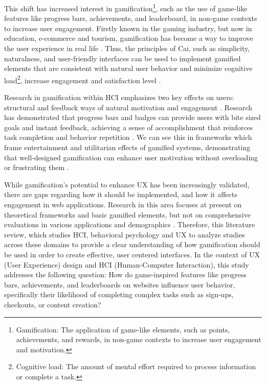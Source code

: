 \documentclass[conference]{IEEEtran}
\begin{document}
This shift has increased interest in gamification\footnote{Gamification: The application of game-like elements, such as points, achievements, and rewards, in non-game contexts to increase user engagement and motivation.}, such as the use of game-like features like progress bars, achievements, and leaderboard, in non-game contexts to increase user engagement. Firstly known in the gaming industry, but now in education, e-commerce and tourism, gamification has become a way to improve the user experience in real life \cite{hiererra2022, clanton1998}. Thus, the principles of Cai, such as simplicity, naturalness, and user-friendly interfaces can be used to implement gamified elements that are consistent with natural user behavior and minimize cognitive load\footnote{Cognitive load: The amount of mental effort required to process information or complete a task.}, increase engagement and satisfaction level \cite{cai2009}.

Research in gamification within HCI emphasizes two key effects on users: structural and feedback ways of natural motivation and engagement \cite{healey2011, clanton1998}. Research has demonstrated that progress bars and badges can provide users with bite sized goals and instant feedback, achieving a sense of accomplishment that reinforces task completion and behavior repetition \cite{marchionini1992, chang2016}. We can see this in frameworks which frame entertainment and utilitarian effects of gamified systems, demonstrating that well-designed gamification can enhance user motivation without overloading or frustrating them \cite{deliu2017}.

While gamification’s potential to enhance UX has been increasingly validated, there are gaps regarding how it should be implemented, and how it affects engagement in web applications. Research in this area focuses at present on theoretical frameworks and basic gamified elements, but not on comprehensive evaluations in various applications and demographics \cite{kompaniets2020}. Therefore, this literature review, which studies HCI, behavioral psychology and UX to analyze studies across these domains to provide a clear understanding of how gamification should be used in order to create effective, user centered interfaces. In the context of UX (User Experience) design and HCI (Human-Computer Interaction), this study addresses the following question: How do game-inspired features like progress bars, achievements, and leaderboards on websites influence user behavior, specifically their likelihood of completing complex tasks such as sign-ups, checkouts, or content creation?
\end{document}

